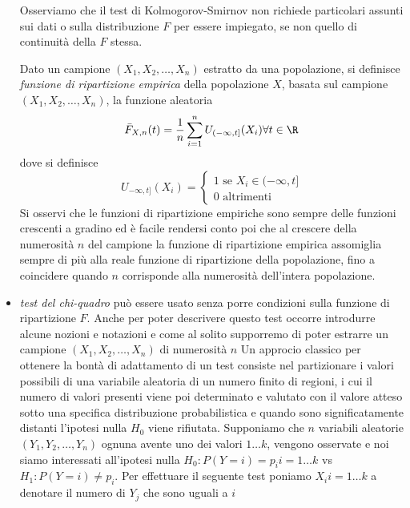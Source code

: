 \begin{itemize}
        Osserviamo che il test di Kolmogorov-Smirnov non richiede particolari assunti sui dati o sulla distribuzione $F$
        per essere impiegato, se non quello di continuità della $F$ stessa.

        Dato un campione $(X_1, X_2, \dots, X_n)$ estratto da una popolazione, si definisce \emph{funzione di ripartizione empirica}
        della popolazione $X$, basata sul campione $(X_1, X_2, \dots, X_n)$, la funzione aleatoria
        \[ \bar{F}_{X, n}(t) = \frac{1}{n} \sum _{i = 1}^n U_{(-\infty, t]}(X_i) \forall t \in \R \]
        dove si definisce
        \[ U_{-\infty, t]}(X_i) = \begin{cases}
                                    1 \mbox{ se } X_i \in (-\infty, t] \\
                                    0 \mbox{ altrimenti}
                                  \end{cases} \]
        Si osservi che le funzioni di ripartizione empiriche sono sempre delle funzioni crescenti a gradino ed è facile
        rendersi conto poi che al crescere della numerosità $n$ del campione la funzione di ripartizione empirica 
        assomiglia sempre di più alla reale funzione di ripartizione della popolazione, fino a coincidere quando $n$
        corrisponde alla numerosità dell'intera popolazione.
    \item \emph{test del chi-quadro} può essere usato senza porre condizioni sulla funzione di ripartizione $F$. 
          Anche per poter descrivere questo test occorre introdurre alcune nozioni e notazioni e come al solito supporremo
          di poter estrarre un campione $(X_1, X_2, \dots, X_n)$ di numerosità $n$
          Un approcio classico per ottenere la bontà di adattamento di un test consiste nel partizionare i valori possibili di una variabile aleatoria di un numero finito di regioni,
          i cui il numero di valori presenti viene poi determinato e valutato con il valore atteso sotto una specifica distribuzione probabilistica e quando sono significatamente distanti           l'ipotesi nulla $H_0$ viene rifiutata.\newline
          Supponiamo che $n$ variabili aleatorie $(Y_1, Y_2, \dots, Y_n)$ ognuna avente uno dei valori $1\dots k$, vengono osservate e noi siamo interessati all'ipotesi nulla 
          $H_0:P(Y = i) = p_i  i = 1 \dots k$ vs $H_1: P(Y = i) \neq p_i$.\newline
          Per effettuare il seguente test poniamo $X_i i = 1 \dots k$ a denotare il numero di $Y_j$ che sono uguali a $i$

\end{itemize}
